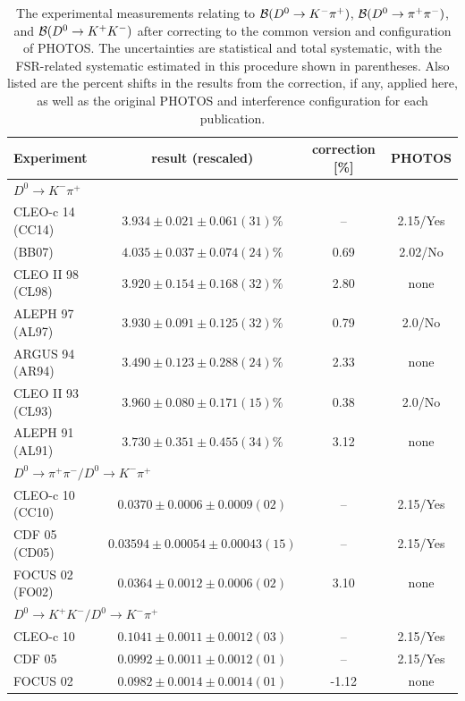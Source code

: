 \begin{table}
  \centering 
  \caption{The experimental measurements relating to ${\cal B}(D^0\to K^-\pi^+)$, ${\cal B}(D^0\to \pi^+\pi^-)$, and ${\cal B}(D^0\to K^+ K^-)$ after correcting to the common version and configuration of PHOTOS.  The uncertainties are statistical and total systematic, with the FSR-related systematic estimated in this procedure shown in parentheses.  Also listed are the percent shifts in the results from the correction, if any, applied here, as well as the original PHOTOS and interference configuration for each publication.}
  \label{tab:FSR_corrections}
\begin{tabular}{lccc}
\hline \hline
Experiment & result (rescaled) & correction [\%] & PHOTOS \\ \hline
\multicolumn{4}{l}{$D^{0} \to K^{-} \pi^{+}$} \\
      CLEO-c 14  (CC14) \cite{Bonvicini:2013vxi} & $3.934 \pm 0.021 \pm 0.061(31)\%$ & --   & 2.15/Yes \\
      \babar 07  (BB07) \cite{Aubert:2007wn}   & $4.035 \pm 0.037 \pm 0.074(24)\%$ & 0.69 & 2.02/No \\
      CLEO II 98 (CL98) \cite{Artuso:1997mc}   & $3.920 \pm 0.154 \pm 0.168(32)\%$ & 2.80 & none \\
      ALEPH 97   (AL97) \cite{Barate:1997mm}   & $3.930 \pm 0.091 \pm 0.125(32)\%$ & 0.79 & 2.0/No \\
      ARGUS 94   (AR94) \cite{Albrecht:1994nb} & $3.490 \pm 0.123 \pm 0.288(24)\%$ & 2.33 & none \\
      CLEO II 93 (CL93) \cite{Akerib:1993pm}   & $3.960 \pm 0.080 \pm 0.171(15)\%$ & 0.38 & 2.0/No \\
      ALEPH 91   (AL91) \cite{Decamp:1991jw}   & $3.730 \pm 0.351 \pm 0.455(34)\%$ & 3.12 & none \\
\multicolumn{4}{l}{$D^{0} \to \pi^{+}\pi^{-} / D^{0} \to K^{-} \pi^{+}$} \\
      CLEO-c 10  (CC10) \cite{Mendez:2009aa}   & $0.0370  \pm 0.0006  \pm 0.0009(02)$  & --   & 2.15/Yes \\
      CDF 05     (CD05) \cite{Acosta:2004ts}   & $0.03594 \pm 0.00054 \pm 0.00043(15)$ & --   & 2.15/Yes \\
      FOCUS 02   (FO02) \cite{Link:2002hi}     & $0.0364  \pm 0.0012  \pm 0.0006(02)$  & 3.10 & none \\
\multicolumn{4}{l}{$D^{0} \to K^{+}K^{-} / D^{0} \to K^{-} \pi^{+}$} \\
      CLEO-c 10   \cite{Mendez:2009aa}         & $0.1041 \pm 0.0011 \pm 0.0012(03)$ & --    & 2.15/Yes \\ 
      CDF 05      \cite{Acosta:2004ts}         & $0.0992 \pm 0.0011 \pm 0.0012(01)$ & --    & 2.15/Yes \\
      FOCUS 02    \cite{Link:2002hi}           & $0.0982 \pm 0.0014 \pm 0.0014(01)$ & -1.12 & none \\ \hline
\end{tabular}
\end{table}

